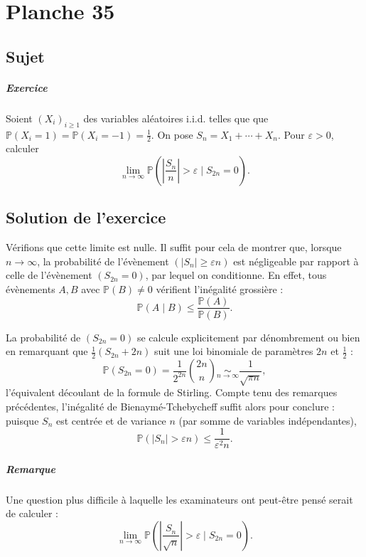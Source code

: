 \chapter{Planche 35}

\section{Sujet}

\paragraph{Exercice}
Soient $(X_i)_{i\geqslant 1}$ des variables aléatoires i.i.d. telles que que $\mathbb P(X_i = 1) = \mathbb P(X_i = -1) = \frac12.$
On pose $S_n = X_1 + \cdots + X_n$.
Pour $\varepsilon > 0$, calculer
\[
\lim_{n\to\infty} \mathbb P\left(\left|\frac{S_n}n\right| > \varepsilon \mid S_{2n} = 0\right).
\]

\section{Solution de l'exercice}
Vérifions que cette limite est nulle.
Il suffit pour cela de montrer que, lorsque $n \to \infty$, la probabilité de l'évènement $(|S_n| \geq \varepsilon n)$ est négligeable par rapport à celle de l'évènement $(S_{2n} = 0)$, par lequel on conditionne. En effet, tous évènements $A,B$ avec $\mathbb P(B) \neq 0$ vérifient l'inégalité grossière :
\[
\mathbb P(A \mid B) \leqslant \frac{\mathbb P(A)}{\mathbb P(B)}.
\]

La probabilité de $(S_{2n} = 0)$ se calcule explicitement par dénombrement ou bien en remarquant que $\frac12(S_{2n}+{2n})$ suit une loi binomiale de paramètres $2n$ et $\frac12$ :
\[
\mathbb P(S_{2n} = 0) = \frac1{2^{2n}}\binom{2n}{n} \underset{n\to\infty}{\sim} \frac 1{\sqrt{\pi n}},
\]
l'équivalent découlant de la formule de Stirling. Compte tenu des remarques précédentes, l'inégalité de Bienaymé-Tchebycheff suffit alors pour conclure : puisque $S_n$ est centrée et de variance $n$ (par somme de variables indépendantes),
\[
 \mathbb P\left(|S_n| > \varepsilon n\right) \leqslant \frac{1}{\varepsilon^2 n}.
\]

\paragraph{Remarque}
Une question plus difficile à laquelle les examinateurs ont peut-être pensé serait de calculer :
\[
\lim_{n\to\infty} \mathbb P\left(\left|\frac{S_n}{\sqrt n}\right| > \varepsilon \mid S_{2n} = 0\right).
\]

